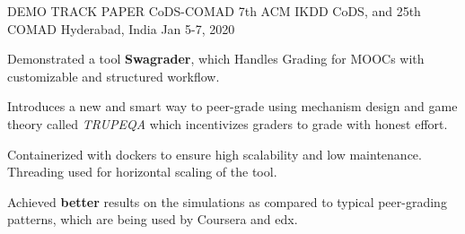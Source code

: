

\begin{cventries}

  \cventry
    {DEMO TRACK PAPER} %
    {CoDS-COMAD 7th ACM IKDD CoDS, and 25th COMAD} %
    {Hyderabad, India} %
    {Jan 5-7, 2020} %
    {
      \begin{cvitems} %
        \item {Demonstrated a tool \textbf{Swagrader}, which Handles Grading for MOOCs with customizable and structured workflow.}
        \item {Introduces a new and smart way to peer-grade using mechanism design and game theory called \textit{TRUPEQA} which incentivizes graders to grade with honest effort.}
        \item {Containerized with dockers to ensure high scalability and low maintenance. Threading used for horizontal scaling of the tool.}
        \item {Achieved \textbf{better} results on the simulations as compared to typical peer-grading patterns, which are being used by Coursera and edx.}
      \end{cvitems}
    }


\end{cventries}

